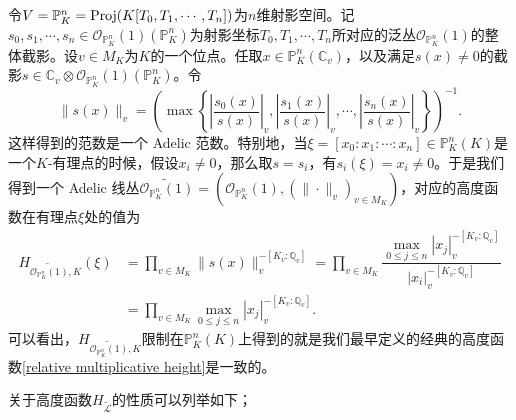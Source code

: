 \begin{example}
令$V = \mathbb{P}_K^n = \operatorname{Proj}(K[T_0, T_1, \cdots, T_n])$为$n$维射影空间。记$s_0, s_1, \cdots, s_n \in \mathcal{O}_{\mathbb{P}_K^n}(1)(\mathbb{P}_K^n)$为射影坐标$T_0, T_1, \cdots, T_n$所对应的泛丛$\mathcal{O}_{\mathbb{P}_K^n}(1)$的整体截影。设$v\in M_K$为$K$的一个位点。任取$x\in \mathbb{P}_K^n(\mathbb{C}_v)$，以及满足$s(x)\neq 0$的截影$s \in \mathbb{C}_v\otimes \mathcal{O}_{\mathbb{P}_K^n}(1)(\mathbb{P}_K^n)$。令
\begin{equation}
\|s(x)\|_v = \left( \max \left\{ \left| \dfrac{s_0(x)}{s(x)} \right|_v, \left| \dfrac{s_1(x)}{s(x)} \right|_v, \cdots, \left| \dfrac{s_n(x)}{s(x)} \right|_v \right\} \right)^{-1}.
\end{equation}
这样得到的范数是一个 Adelic 范数。特别地，当$\xi = [x_0: x_1: \cdots: x_n] \in \mathbb{P}_K^n(K)$是一个$K$-有理点的时候，假设$x_i\neq 0$，那么取$s = s_i$，有$s_i(\xi) = x_i \neq 0$。于是我们得到一个 Adelic 线丛$\widetilde{\mathcal{O}_{\mathbb{P}_K^n}(1)} = (\mathcal{O}_{\mathbb{P}_K^n}(1), (\|\cdot\|_v)_{v\in M_K})$，对应的高度函数在有理点$\xi$处的值为
\begin{align}
H_{\widetilde{\mathcal{O}_{\mathbb{P}_K^n}(1)}, K}(\xi) & = \prod\limits_{v\in M_K} \|s(x)\|_v^{-[K_v:\mathbb{Q}_v]} = \prod\limits_{v\in M_K} \dfrac{\max\limits_{0\leqslant j \leqslant n} |x_j|_v^{-[K_v:\mathbb{Q}_v]}}{|x_i|_v^{-[K_v:\mathbb{Q}_v]}} \\
& = \prod\limits_{v\in M_K} \max\limits_{0\leqslant j \leqslant n} |x_j|_v^{-[K_v:\mathbb{Q}_v]}.
\end{align}
可以看出，$H_{\widetilde{\mathcal{O}_{\mathbb{P}_K^n}(1)}, K}$限制在$\mathbb{P}_K^n(K)$上得到的就是我们最早定义的经典的高度函数\eqref{relative multiplicative height}是一致的。
\end{example}

关于高度函数$H_{\widetilde{\mathscr{L}}}$的性质可以列举如下；

